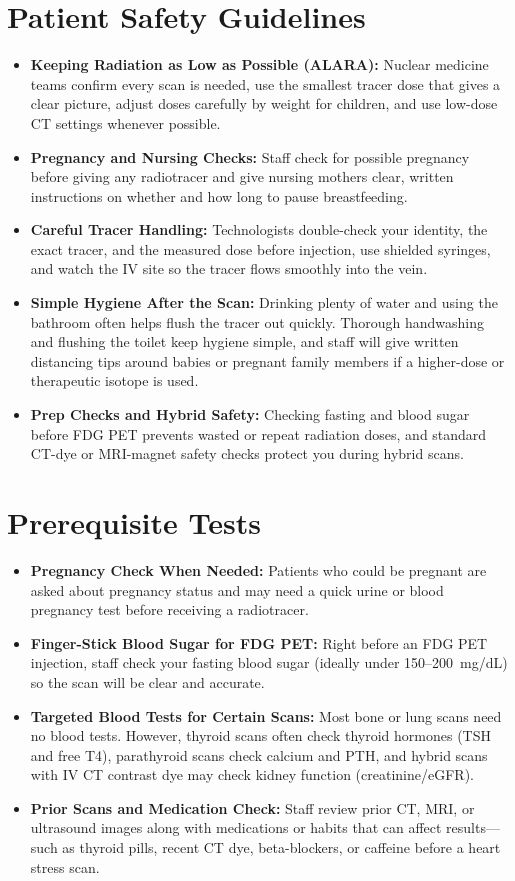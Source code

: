 \section{Patient Safety Guidelines}
\begin{itemize}
  \item \textbf{Keeping Radiation as Low as Possible (ALARA):} Nuclear medicine teams confirm every scan is needed, use the smallest tracer dose that gives a clear picture, adjust doses carefully by weight for children, and use low-dose CT settings whenever possible.
  \item \textbf{Pregnancy and Nursing Checks:} Staff check for possible pregnancy before giving any radiotracer and give nursing mothers clear, written instructions on whether and how long to pause breastfeeding.
  \item \textbf{Careful Tracer Handling:} Technologists double-check your identity, the exact tracer, and the measured dose before injection, use shielded syringes, and watch the IV site so the tracer flows smoothly into the vein.
  \item \textbf{Simple Hygiene After the Scan:} Drinking plenty of water and using the bathroom often helps flush the tracer out quickly. Thorough handwashing and flushing the toilet keep hygiene simple, and staff will give written distancing tips around babies or pregnant family members if a higher-dose or therapeutic isotope is used.
  \item \textbf{Prep Checks and Hybrid Safety:} Checking fasting and blood sugar before FDG PET prevents wasted or repeat radiation doses, and standard CT-dye or MRI-magnet safety checks protect you during hybrid scans.
\end{itemize}

\section{Prerequisite Tests}
\begin{itemize}
  \item \textbf{Pregnancy Check When Needed:} Patients who could be pregnant are asked about pregnancy status and may need a quick urine or blood pregnancy test before receiving a radiotracer.
  \item \textbf{Finger-Stick Blood Sugar for FDG PET:} Right before an FDG PET injection, staff check your fasting blood sugar (ideally under 150--200~mg/dL) so the scan will be clear and accurate.
  \item \textbf{Targeted Blood Tests for Certain Scans:} Most bone or lung scans need no blood tests. However, thyroid scans often check thyroid hormones (TSH and free T4), parathyroid scans check calcium and PTH, and hybrid scans with IV CT contrast dye may check kidney function (creatinine/eGFR).
  \item \textbf{Prior Scans and Medication Check:} Staff review prior CT, MRI, or ultrasound images along with medications or habits that can affect results---such as thyroid pills, recent CT dye, beta-blockers, or caffeine before a heart stress scan.
\end{itemize}

